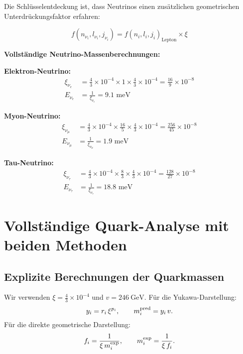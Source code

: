 \documentclass[12pt,a4paper]{article}
\begin{document}
	Die Schlüsselentdeckung ist, dass Neutrinos einen zusätzlichen geometrischen Unterdrückungsfaktor erfahren:
	
	\begin{equation}
		f(n_{\nu_i}, l_{\nu_i}, j_{\nu_i}) = f(n_i, l_i, j_i)_{\text{Lepton}} \times \xi
		\label{eq:neutrino_suppression}
	\end{equation}
	
	\textbf{Vollständige Neutrino-Massenberechnungen:}
	
	\textbf{Elektron-Neutrino:}
	\begin{align}
		\xi_{\nu_e} &= \frac{4}{3} \times 10^{-4} \times 1 \times \frac{4}{3} \times 10^{-4} = \frac{16}{9} \times 10^{-8} \\
		E_{\nu_e} &= \frac{1}{\xi_{\nu_e}} = 9.1 \text{ meV}
	\end{align}
	
	\textbf{Myon-Neutrino:}
	\begin{align}
		\xi_{\nu_\mu} &= \frac{4}{3} \times 10^{-4} \times \frac{16}{5} \times \frac{4}{3} \times 10^{-4} = \frac{256}{45} \times 10^{-8} \\
		E_{\nu_\mu} &= \frac{1}{\xi_{\nu_\mu}} = 1.9 \text{ meV}
	\end{align}
	
	\textbf{Tau-Neutrino:}
	\begin{align}
		\xi_{\nu_\tau} &= \frac{4}{3} \times 10^{-4} \times \frac{8}{3} \times \frac{4}{3} \times 10^{-4} = \frac{128}{27} \times 10^{-8} \\
		E_{\nu_\tau} &= \frac{1}{\xi_{\nu_\tau}} = 18.8 \text{ meV}
	\end{align}
	
	\section{Vollständige Quark-Analyse mit beiden Methoden}
	\label{sec:quark_analyse}
	
	\subsection{Explizite Berechnungen der Quarkmassen}
	\label{subsec:quark_calculations}
	
	Wir verwenden $\xi=\tfrac{4}{3}\times10^{-4}$ und $v=246\ \mathrm{GeV}$.
	Für die Yukawa-Darstellung:
	\[
	y_i = r_i\,\xi^{p_i},\qquad m_i^{\rm pred}=y_i\,v.
	\]
	Für die direkte geometrische Darstellung:
	\[
	f_i=\frac{1}{\xi\, m_i^{\rm exp}},\qquad m_i^{\rm exp}=\frac{1}{\xi\, f_i}.
	\]
	
\end{document}

